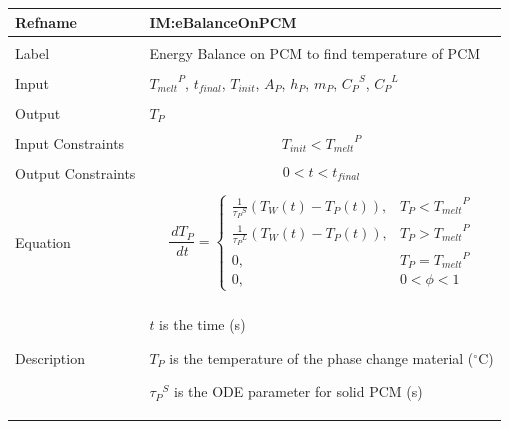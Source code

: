 \documentclass[12pt]{article}
\begin{document}
\noindent \begin{minipage}{\textwidth}
\begin{tabular}{p{} p{}}
\toprule \textbf{Refname} & \textbf{IM:eBalanceOnPCM}
\label{IM:eBalanceOnPCM}
\\ \midrule \\
Label & Energy Balance on PCM to find temperature of PCM
\\ \midrule \\
Input & ${{T_{melt}}^{P}}$, ${t_{final}}$, ${T_{init}}$, ${A_{P}}$, ${h_{P}}$, ${m_{P}}$, ${{C_{P}}^{S}}$, ${{C_{P}}^{L}}$
\\ \midrule \\
Output & ${T_{P}}$
\\ \midrule \\
Input Constraints & \begin{displaymath}
                    {T_{init}}<{{T_{melt}}^{P}}
                    \end{displaymath}
\\ \midrule \\
Output Constraints & \begin{displaymath}
                     0<t<{t_{final}}
                     \end{displaymath}
\\ \midrule \\
Equation & \begin{displaymath}
           \frac{\,d{T_{P}}}{\,dt}=\begin{cases}
\frac{1}{{{τ_{P}}^{S}}} \left({T_{W}}\left(t\right)-{T_{P}}\left(t\right)\right), & {T_{P}}<{{T_{melt}}^{P}}\\
\frac{1}{{{τ_{P}}^{L}}} \left({T_{W}}\left(t\right)-{T_{P}}\left(t\right)\right), & {T_{P}}>{{T_{melt}}^{P}}\\
0, & {T_{P}}={{T_{melt}}^{P}}\\
0, & 0<ϕ<1
\end{cases}
           \end{displaymath}
\\ \midrule \\
Description & \begin{symbDescription}
              \item{$t$ is the time (s)}
              \item{${T_{P}}$ is the temperature of the phase change material (${}^{\circ}$C)}
              \item{${{τ_{P}}^{S}}$ is the ODE parameter for solid PCM (s)}

\end{symbDescription}
\end{tabular}
\end{minipage}
\end{document}
